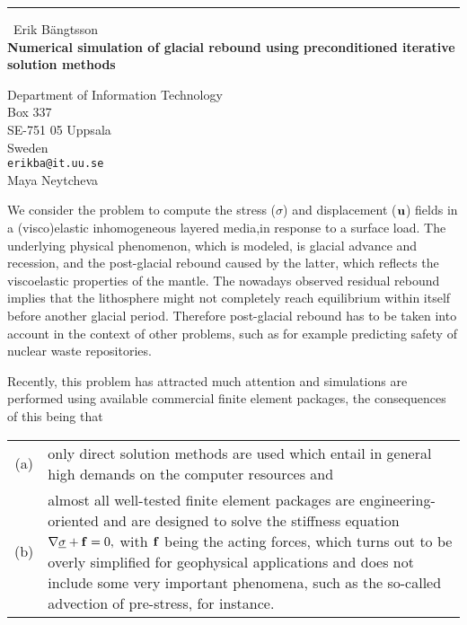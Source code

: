 \documentclass{report}
\begin{document}
\begin{center}
\rule{6in}{1pt} \
{\large Erik B{\"a}ngtsson \\
{\bf Numerical simulation of glacial rebound using preconditioned iterative solution methods}}

Department of Information Technology \\ Box 337 \\ SE-751 05 Uppsala \\ Sweden
\\
{\tt erikba@it.uu.se}\\
Maya Neytcheva\end{center}

We consider the problem to compute the stress ($\sigma$) and
displacement ($\bf{u}$) fields in a (visco)elastic inhomogeneous layered
media,in response to a surface load. The underlying physical phenomenon,
which is modeled, is glacial advance and recession, and the post-glacial
rebound caused by the latter, which reflects the viscoelastic properties
of the mantle. The nowadays observed residual rebound implies that the
lithosphere might not completely reach equilibrium within itself before
another glacial period. Therefore post-glacial rebound has to be taken
into account in the context of other problems, such as for example
predicting safety of nuclear waste repositories.

Recently, this problem has attracted much attention
and simulations are performed using available commercial
finite element packages, the consequences of this being that

\begin{tabular}{cp{5.62in}}
(a)&only direct solution methods are used which entail in general high
demands on the computer resources and\\
(b)& almost all well-tested finite element packages are
engineering-oriented and are designed to solve the stiffness equation
$
\nabla\underline{\sigma} + {\bf f} = 0,
$
with ${\bf f}$ being the acting forces, which turns out to be overly
simplified for geophysical applications and does not include some very
important phenomena, such as the so-called advection of pre-stress, for
instance.
\end{tabular}
\end{document}
